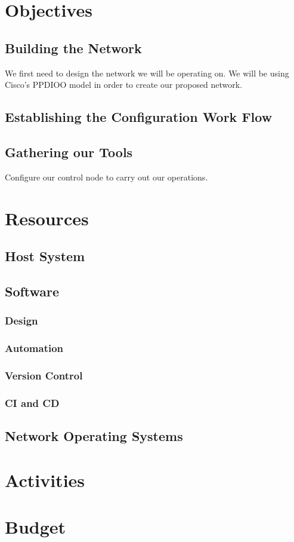 \documentclass[12pt, letterpaper]{article}
\begin{document}
\newpage

\section{Objectives}

	\subsection{Building the Network}
We first need to design the network we will be operating on. We will be using Cisco's PPDIOO model in order to create our proposed network.

	\subsection{Establishing the Configuration Work Flow}

	\subsection{Gathering our Tools}
Configure our control node to carry out our operations.




\newpage

\section{Resources}
	
	\subsection{Host System}
	
	\subsection{Software}

		\subsubsection{Design}
		
		\subsubsection{Automation}
		
		\subsubsection{Version Control}
		
		\subsubsection{CI and CD}
		
	\subsection{Network Operating Systems}

\newpage

\section{Activities}

\newpage

\section{Budget}
\end{document}
